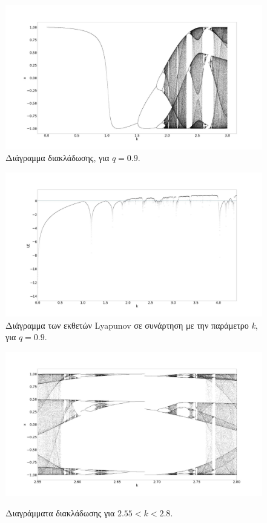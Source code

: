 \begin{figure}[ht]
	\centering
	\includegraphics[width=1\linewidth]{LateX images/cheb q=0.9/g1}
	\caption{Διάγραμμα διακλάδωσης, για $q=0.9$.}
	\label{f:g65}
\end{figure}


\begin{figure}[ht]
	\centering
	\includegraphics[width=1\linewidth]{LateX images/cheb q=0.9/g2}
	\caption{Διάγραμμα των εκθετών Lyapunov σε συνάρτηση με την παράμετρο \emph{k}, για $q=0.9$.}
	\label{f:g66}
\end{figure}


\begin{figure}[ht]
	\centering
	\includegraphics[width=\textwidth]{LateX images/cheb q=0.9/g3}
	\label{f:g67}
	\caption{Διαγράμματα διακλάδωσης για $2.55<k<2.8$. }
\end{figure}

